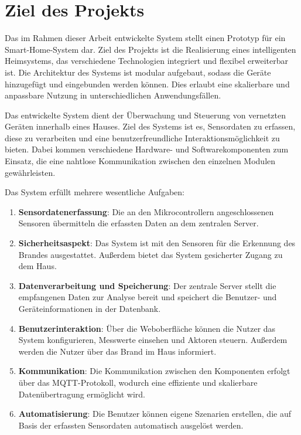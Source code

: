 \documentclass[12pt, letterpaper]{article}
\begin{document}
\section{Ziel des Projekts}
\par Das im Rahmen dieser Arbeit entwickelte System stellt einen Prototyp für ein Smart-Home-System dar. Ziel des Projekts ist die Realisierung eines intelligenten Heimsystems, das verschiedene Technologien integriert und flexibel erweiterbar ist. Die Architektur des Systems ist modular aufgebaut, sodass die Geräte hinzugefügt und eingebunden werden können. Dies erlaubt eine skalierbare und anpassbare Nutzung in unterschiedlichen Anwendungsfällen.
\par Das entwickelte System dient der Überwachung und Steuerung von vernetzten Geräten innerhalb eines Hauses. Ziel des Systems ist es, Sensordaten zu erfassen, diese zu verarbeiten und eine benutzerfreundliche Interaktionsmöglichkeit zu bieten. Dabei kommen verschiedene Hardware- und Softwarekomponenten zum Einsatz, die eine nahtlose Kommunikation zwischen den einzelnen Modulen gewährleisten.
\par Das System erfüllt mehrere wesentliche Aufgaben:
\begin{enumerate}
  \item \textbf{Sensordatenerfassung}: Die an den Mikrocontrollern angeschlossenen Sensoren übermitteln die erfassten Daten an dem zentralen Server.
  \item \textbf{Sicherheitsaspekt}: Das System ist mit den Sensoren für die Erkennung des Brandes ausgestattet. Außerdem bietet das System gesicherter Zugang zu dem Haus.
  \item \textbf{Datenverarbeitung und Speicherung}: Der zentrale Server stellt die empfangenen Daten zur Analyse bereit und speichert die Benutzer- und Geräteinformationen in der Datenbank.
  \item \textbf{Benutzerinteraktion}: Über die Weboberfläche können die Nutzer das System konfigurieren, Messwerte einsehen und Aktoren steuern. Außerdem werden die Nutzer über das Brand im Haus informiert.
  \item \textbf{Kommunikation}: Die Kommunikation zwischen den Komponenten erfolgt über das MQTT-Protokoll, wodurch eine effiziente und skalierbare Datenübertragung ermöglicht wird.
  \item \textbf{Automatisierung}: Die Benutzer können eigene Szenarien erstellen, die auf Basis der erfassten Sensordaten automatisch ausgelöst werden.
\end{enumerate}
\par 
\end{document}
